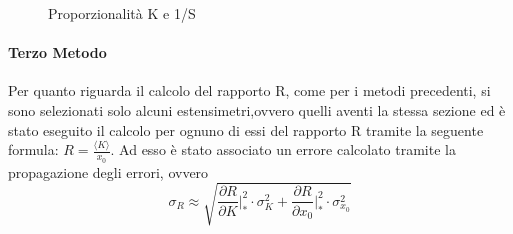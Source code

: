 \documentclass[a4paper,11pt,oneside]{article}
\begin{document}
\begin{figure}[h!]
    \centering
    \caption{Proporzionalità K e 1/S}
\end{figure}



\paragraph{Terzo Metodo}
Per quanto riguarda il calcolo del rapporto R, come per i metodi precedenti, si sono selezionati solo alcuni estensimetri,ovvero quelli aventi la stessa sezione ed è stato eseguito il calcolo per ognuno di essi del rapporto R tramite la seguente formula: $R=\frac{\langle K \rangle}{x_{0}}$. Ad esso è stato associato un errore calcolato tramite la propagazione degli errori, ovvero 
\begin{equation*}
    \sigma_R \approx \sqrt{ \frac{\partial R }{\partial K}\Big|_{\ast}^2 \cdot  \sigma_{K}^2 +  \frac{\partial R }{\partial x_0}\Big|_{\ast}^2 \cdot \sigma_{x_0}^2 }
\end{equation*}
\end{document}
